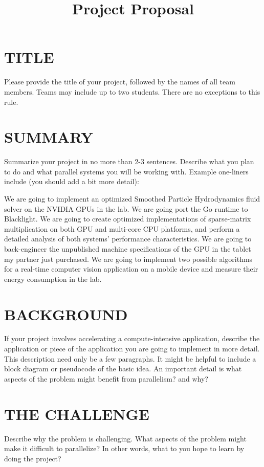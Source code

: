 \documentclass[11pt]{article}
\begin{document}
\title{Project Proposal}
\maketitle
\section{TITLE}
Please provide the title of your project, followed by the names of all team members. Teams may include up to two students. There are no exceptions to this rule.

\section{SUMMARY} 
Summarize your project in no more than 2-3 sentences. Describe what you plan to do and what parallel systems you will be working with. Example one-liners include (you should add a bit more detail):

We are going to implement an optimized Smoothed Particle Hydrodynamics fluid solver on the NVIDIA GPUs in the lab.
We are going port the Go runtime to Blacklight.
We are going to create optimized implementations of sparse-matrix multiplication on both GPU and multi-core CPU platforms, and perform a detailed analysis of both systems' performance characteristics.
We are going to back-engineer the unpublished machine specifications of the GPU in the tablet my partner just purchased.
We are going to implement two possible algorithms for a real-time computer vision application on a mobile device and measure their energy consumption in the lab.

\section{BACKGROUND}
If your project involves accelerating a compute-intensive application, describe the application or piece of the application you are going to implement in more detail. This description need only be a few paragraphs. It might be helpful to include a block diagram or pseudocode of the basic idea. An important detail is what aspects of the problem might benefit from parallelism? and why?

\section{THE CHALLENGE}
Describe why the problem is challenging. What aspects of the problem might make it difficult to parallelize? In other words, what to you hope to learn by doing the project?
\end{document}
